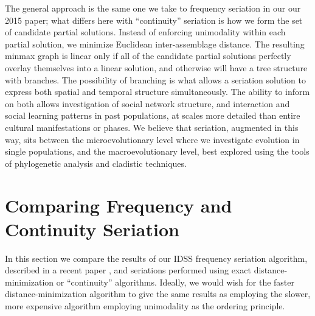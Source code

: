 The general approach is the same one we take to frequency seriation in our our 2015 paper;
what differs here with ``continuity'' seriation is how we form the set
of candidate partial solutions. Instead of enforcing unimodality within
each partial solution, we minimize Euclidean inter-assemblage distance.
The resulting minmax graph is linear only if all of the candidate
partial solutions perfectly overlay themselves into a linear solution,
and otherwise will have a tree structure with branches. The possibility
of branching is what allows a seriation solution to express both spatial
and temporal structure simultaneously. The ability to inform on both
allows investigation of social network structure, and interaction and
social learning patterns in past populations, at scales more detailed
than entire cultural manifestations or phases. We believe that
seriation, augmented in this way, sits between the microevolutionary
level where we investigate evolution in single populations, and the
macroevolutionary level, best explored using the tools of phylogenetic
analysis and cladistic techniques.

\section{Comparing Frequency and Continuity
Seriation}\label{multser:sec:comparing-frequency-and-continuity-seriation}

In this section we compare the results of our IDSS frequency seriation
algorithm, described in a recent paper \citep{Lipo2015},
and seriations performed using exact distance-minimization or ``continuity'' algorithms.
Ideally, we would wish for the faster distance-minimization algorithm to give the 
same results as employing the slower, more expensive algorithm employing unimodality
as the ordering principle.

